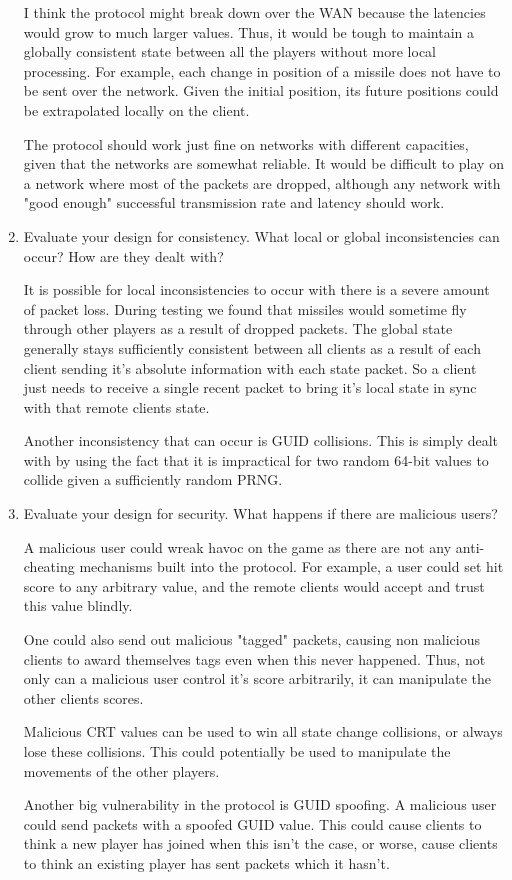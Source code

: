 \documentclass{article}
\begin{document}
\begin{enumerate}
I think the protocol might break down over the WAN because the latencies
would grow to much larger values. Thus, it would be tough to maintain a
globally consistent state between all the players without more local
processing. For example, each change in position of a missile does not
have to be sent over the network. Given the initial position, its future
positions could be extrapolated locally on the client.

The protocol should work just fine on networks with different
capacities, given that the networks are somewhat reliable. It would be
difficult to play on a network where most of the packets are dropped,
although any network with "good enough" successful transmission rate and
latency should work.

\item Evaluate your design for consistency. What local or global
inconsistencies can occur? How are they dealt with?

It is possible for local inconsistencies to occur with there is a severe
amount of packet loss. During testing we found that missiles would
sometime fly through other players as a result of dropped packets. The
global state generally stays sufficiently consistent between all clients
as a result of each client sending it's absolute information with each
state packet. So a client just needs to receive a single recent packet
to bring it's local state in sync with that remote clients state.

Another inconsistency that can occur is GUID collisions. This is simply
dealt with by using the fact that it is impractical for two random
64-bit values to collide given a sufficiently random PRNG.

\item Evaluate your design for security. What happens if there are
malicious users?

A malicious user could wreak havoc on the game as there are not any
anti-cheating mechanisms built into the protocol. For example, a user
could set hit score to any arbitrary value, and the remote clients would
accept and trust this value blindly.

One could also send out malicious "tagged" packets, causing non
malicious clients to award themselves tags even when this never
happened. Thus, not only can a malicious user control it's score
arbitrarily, it can manipulate the other clients scores.

Malicious CRT values can be used to win all state change collisions, or
always lose these collisions. This could potentially be used to
manipulate the movements of the other players.

Another big vulnerability in the protocol is GUID spoofing. A malicious
user could send packets with a spoofed GUID value. This could cause
clients to think a new player has joined when this isn't the case, or
worse, cause clients to think an existing player has sent packets which
it hasn't.

\end{enumerate}
\end{document}
